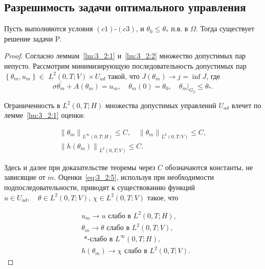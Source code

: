 \subsection{Разрешимость задачи оптимального управления}
\label{subsec:ch3:sec2:subsec5}

\begin{theorem}
    \label{th:3_2:1}
    Пусть выполняются условия $(c1)$-$(c3)$, и $\theta_{0} \leq \theta_{*}$ п.в. в $\Omega$.
    Тогда существует решение задачи P\@.
\end{theorem}

\begin{proof}
    Согласно леммам~\ref{lm:3_2:1} и~\ref{lm:3_2:2} множество допустимых пар непусто.
    Рассмотрим минимизирующую последовательность допустимых
    пар $\left\{\theta_{m}, u_{m}\right\} \in$ $L^{2}(0, T ; V) \times U_{a d}$
    такой, что $J\left(\theta_{m}\right) \rightarrow j=\inf J$, где
    \begin{equation}
        \label{eq:3_2:4}
        \sigma \theta_{m}^{\prime}+A\left(\theta_{m}\right)=u_{m},
        \quad \theta_{m}(0)=\theta_{0},\left.\quad \theta_{m}\right|_{G_{2}} \leq \theta_{*}.
    \end{equation}

    Ограниченность в $L^{2}(0, T; H)$ множества допустимых
    управлений $U_{a d}$ влечет по лемме~\ref{lm:3_2:1} оценки:

    \begin{equation}
        \label{eq:3_2:5}
        \begin{gathered}
            \left\|\theta_{m}\right\|_{L^{\infty}(0, T ; H)} \leq C,
            \quad\left\|\theta_{m}\right\|_{L^{2}(0, T ; V)} \leq C, \\
            \left\|h\left(\theta_{m}\right)\right\|_{L^{2}(0, T ; V)} \leq C.
        \end{gathered}
    \end{equation}

    Здесь и далее при доказательстве теоремы через $C$
    обозначаются константы, не зависящие от $m$.
    Оценки~\eqref{eq:3_2:5}, используя при необходимости подпоследовательности,
    приводят к существованию функций
    $u \in U_{a d}, \quad \theta \in L^{2}(0, T; V)$, $\chi  \in L^{2}(0, T; V)$
    такое, что

    \begin{equation}
        \label{eq:3_2:6}
        \begin{aligned}
            & u_{m} \rightarrow u \text { слабо в } L^{2}(0, T ; H), \\
            & \theta_{m} \rightarrow \theta \text { слабо в }
            L^{2}(0, T ; V) \text {, } \\
            & \text { *-слабо в } L^{\infty}(0, T ; H), \\
            & h\left(\theta_{m}\right) \rightarrow \chi
            \text { слабо в } L^{2}(0, T; V).
        \end{aligned}
    \end{equation}


\end{proof}
